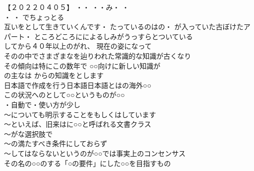 
【２０２２０４０５】
・・
・・み・
・\\
・
・
でちょっとる\\
互いをとして生きていくんです・
たっているのはの・
が入っていた古ぼけたアパート・
ところどころにによるしみがうっすらとついている\\

してから４０年以上のがれ、
現在の姿になって\\
そのの中でさまざまなを辿り\santen{}われた常識的な知識が古くなり\\
その傾向は特にこの数年で\santen
{}○○向けに新しい知識が\\
の主なは\santen
{}からの知識\santen{}をとします\\
日本語で作成を行う日本語\santen{}日本語とはの海外○○\\
{}この状況へのとして○○というものが○○\\
・自動で・使い方が少し\\
〜についても明示することをもしくはしています\\

〜といえば、旧来はに○○と呼ばれる文書クラス\\
〜がな選択肢で\\
〜の満たすべき条件にしておらず\\
〜してはならないというのが○○では事実上のコンセンサス\\
その名の○○のする「○の要件」にした○○を目指すもの\\


